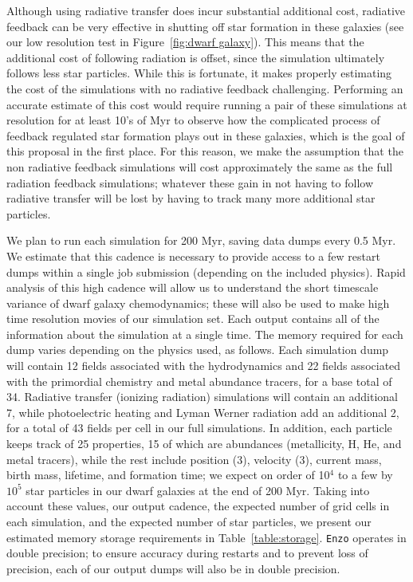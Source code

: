 \documentclass[11pt]{article}
\begin{document}
Although using radiative transfer does incur substantial additional cost, radiative feedback can be very effective in shutting off star formation in these galaxies (see our low resolution test in Figure~\ref{fig:dwarf galaxy}). This means that the additional cost of following radiation is offset, since the simulation ultimately follows less star particles. While this is fortunate, it makes properly estimating the cost of the simulations with no radiative feedback challenging. Performing an accurate estimate of this cost would require running a pair of these simulations at resolution for at least 10's of Myr to observe how the complicated process of feedback regulated star formation plays out in these galaxies, which is the goal of this proposal in the first place. For this reason, we make the assumption that the non radiative feedback simulations will cost approximately the same as the full radiation feedback simulations; whatever these gain in not having to follow radiative transfer will be lost by having to track many more additional star particles. 


We plan to run each simulation for 200 Myr, saving data dumps every 0.5 Myr. We estimate that this cadence is necessary to provide access to a few restart dumps within a single job submission (depending on the included physics). Rapid analysis of this high cadence will allow us to understand the short timescale variance of dwarf galaxy chemodynamics; these will also be used to make high time resolution movies of our simulation set. Each output contains all of the information about the simulation at a single time. The memory required for each dump varies depending on the physics used, as follows. Each simulation dump will contain 12 fields associated with the hydrodynamics and 22 fields associated with the primordial chemistry and metal abundance tracers, for a base total of 34. Radiative transfer (ionizing radiation) simulations will contain an additional 7, while photoelectric heating and Lyman Werner radiation add an additional 2, for a total of 43 fields per cell in our full simulations. In addition, each particle keeps track of 25 properties, 15 of which are abundances (metallicity, H, He, and metal tracers), while the rest include position (3), velocity (3), current mass, birth mass, lifetime, and formation time; we expect on order of 10$^{4}$ to a few by $10^{5}$ star particles in our dwarf galaxies at the end of 200 Myr. Taking into account these values, our output cadence, the expected number of grid cells in each simulation, and the expected number of star particles, we present our estimated memory storage requirements in Table~\ref{table:storage}. \texttt{Enzo} operates in double precision; to ensure accuracy during restarts and to prevent loss of precision, each of our output dumps will also be in double precision.
\end{document}
